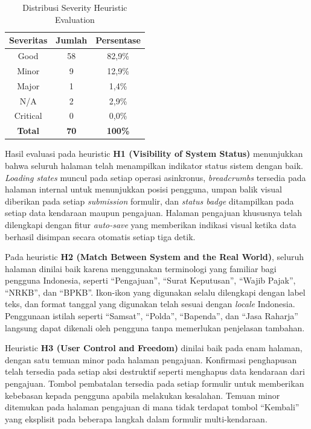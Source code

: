 \documentclass[conference]{IEEEtran}
\begin{document}
\begin{table}[!t]
\centering
\caption{Distribusi Severity Heuristic Evaluation}
\label{tab:severity}
\begin{tabular}{|c|c|c|}
\hline
\textbf{Severitas} & \textbf{Jumlah} & \textbf{Persentase} \\
\hline
Good & 58 & 82,9\% \\
Minor & 9 & 12,9\% \\
Major & 1 & 1,4\% \\
N/A & 2 & 2,9\% \\
Critical & 0 & 0,0\% \\
\hline
\textbf{Total} & \textbf{70} & \textbf{100\%} \\
\hline
\end{tabular}
\end{table}

Hasil evaluasi pada heuristic \textbf{H1 (Visibility of System Status)} menunjukkan
bahwa seluruh halaman telah menampilkan indikator status sistem dengan baik.
\emph{Loading states} muncul pada setiap operasi asinkronus, \emph{breadcrumbs}
tersedia pada halaman internal untuk menunjukkan posisi pengguna, umpan balik visual
diberikan pada setiap \emph{submission} formulir, dan \emph{status badge} ditampilkan
pada setiap data kendaraan maupun pengajuan. Halaman pengajuan khususnya telah
dilengkapi dengan fitur \emph{auto-save} yang memberikan indikasi visual ketika data
berhasil disimpan secara otomatis setiap tiga detik.

Pada heuristic \textbf{H2 (Match Between System and the Real World)}, seluruh halaman
dinilai baik karena menggunakan terminologi yang familiar bagi pengguna Indonesia,
seperti ``Pengajuan'', ``Surat Keputusan'', ``Wajib Pajak'', ``NRKB'', dan ``BPKB''.
Ikon-ikon yang digunakan selalu dilengkapi dengan label teks, dan format tanggal yang
digunakan telah sesuai dengan \emph{locale} Indonesia. Penggunaan istilah seperti
``Samsat'', ``Polda'', ``Bapenda'', dan ``Jasa Raharja'' langsung dapat dikenali oleh
pengguna tanpa memerlukan penjelasan tambahan.

Heuristic \textbf{H3 (User Control and Freedom)} dinilai baik pada enam halaman, dengan
satu temuan minor pada halaman pengajuan. Konfirmasi penghapusan telah tersedia pada
setiap aksi destruktif seperti menghapus data kendaraan dari pengajuan. Tombol
pembatalan tersedia pada setiap formulir untuk memberikan kebebasan kepada pengguna
apabila melakukan kesalahan. Temuan minor ditemukan pada halaman pengajuan di mana
tidak terdapat tombol ``Kembali'' yang eksplisit pada beberapa langkah dalam formulir
multi-kendaraan.
\end{document}
